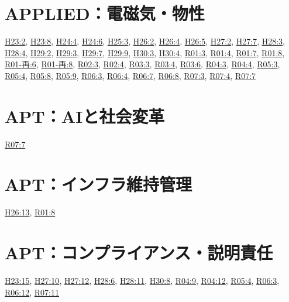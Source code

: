 \section{APPLIED：電磁気・物性}
\hyperref[q:h23-reg-applied-02]{H23:2}, \hyperref[q:h23-reg-applied-08]{H23:8}, \hyperref[q:h24-reg-applied-04]{H24:4}, \hyperref[q:h24-reg-applied-06]{H24:6}, \hyperref[q:h25-reg-applied-03]{H25:3}, \hyperref[q:h26-reg-applied-02]{H26:2}, \hyperref[q:h26-reg-applied-04]{H26:4}, \hyperref[q:h26-reg-applied-05]{H26:5}, \hyperref[q:h27-reg-applied-02]{H27:2}, \hyperref[q:h27-reg-applied-07]{H27:7}, \hyperref[q:h28-reg-applied-03]{H28:3}, \hyperref[q:h28-reg-applied-04]{H28:4}, \hyperref[q:h29-reg-applied-02]{H29:2}, \hyperref[q:h29-reg-applied-03]{H29:3}, \hyperref[q:h29-reg-applied-07]{H29:7}, \hyperref[q:h29-reg-applied-09]{H29:9}, \hyperref[q:h30-reg-applied-03]{H30:3}, \hyperref[q:h30-reg-applied-04]{H30:4}, \hyperref[q:r01-reg-applied-03]{R01:3}, \hyperref[q:r01-reg-applied-04]{R01:4}, \hyperref[q:r01-reg-applied-07]{R01:7}, \hyperref[q:r01-reg-applied-08]{R01:8}, \hyperref[q:r01-ret-applied-06]{R01-再:6}, \hyperref[q:r01-ret-applied-08]{R01-再:8}, \hyperref[q:r02-reg-applied-03]{R02:3}, \hyperref[q:r02-reg-applied-04]{R02:4}, \hyperref[q:r03-reg-applied-03]{R03:3}, \hyperref[q:r03-reg-applied-04]{R03:4}, \hyperref[q:r03-reg-applied-06]{R03:6}, \hyperref[q:r04-reg-applied-03]{R04:3}, \hyperref[q:r04-reg-applied-04]{R04:4}, \hyperref[q:r05-reg-applied-03]{R05:3}, \hyperref[q:r05-reg-applied-04]{R05:4}, \hyperref[q:r05-reg-applied-08]{R05:8}, \hyperref[q:r05-reg-applied-09]{R05:9}, \hyperref[q:r06-reg-applied-03]{R06:3}, \hyperref[q:r06-reg-applied-04]{R06:4}, \hyperref[q:r06-reg-applied-07]{R06:7}, \hyperref[q:r06-reg-applied-08]{R06:8}, \hyperref[q:r07-reg-applied-03]{R07:3}, \hyperref[q:r07-reg-applied-04]{R07:4}, \hyperref[q:r07-reg-applied-07]{R07:7}
\section{APT：AIと社会変革}
\hyperref[q:r07-reg-apt-07]{R07:7}
\section{APT：インフラ維持管理}
\hyperref[q:h26-reg-apt-13]{H26:13}, \hyperref[q:r01-reg-apt-08]{R01:8}
\section{APT：コンプライアンス・説明責任}
\hyperref[q:h23-reg-apt-15]{H23:15}, \hyperref[q:h27-reg-apt-10]{H27:10}, \hyperref[q:h27-reg-apt-12]{H27:12}, \hyperref[q:h28-reg-apt-06]{H28:6}, \hyperref[q:h28-reg-apt-11]{H28:11}, \hyperref[q:h30-reg-apt-08]{H30:8}, \hyperref[q:r04-reg-apt-09]{R04:9}, \hyperref[q:r04-reg-apt-12]{R04:12}, \hyperref[q:r05-reg-apt-04]{R05:4}, \hyperref[q:r06-reg-apt-03]{R06:3}, \hyperref[q:r06-reg-apt-12]{R06:12}, \hyperref[q:r07-reg-apt-11]{R07:11}
